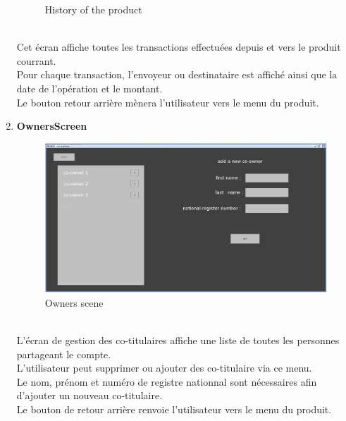 \documentclass[../rapport.tex]{subfiles}
\begin{document}
\begin{enumerate}
\begin{figure}[h!]
				\caption{History of the product}
		\end{figure}
		\\
Cet écran affiche toutes les transactions effectuées depuis et vers le produit courrant.\\
Pour chaque transaction, l'envoyeur ou destinataire est affiché ainsi que la date de l'opération et le montant.\\
Le bouton retour arrière mènera l'utilisateur vers le menu du produit.
\newpage
\item \textbf{OwnersScreen}\\
		\begin{figure}[h!]
				\centering \includegraphics[scale=0.2]{ressources/photos_diagrammes/app1/gui/owners.jpg}
				\caption{Owners scene}
		\end{figure}
		\\
L'écran de gestion des co-titulaires affiche une liste de toutes les personnes partageant le compte.\\
L'utilisateur peut supprimer ou ajouter des co-titulaire via ce menu.\\
Le nom, prénom et numéro de registre nationnal sont nécessaires afin d'ajouter un nouveau co-titulaire.\\
Le bouton de retour arrière renvoie l'utilisateur vers le menu du produit.

\end{enumerate}
\end{document}
